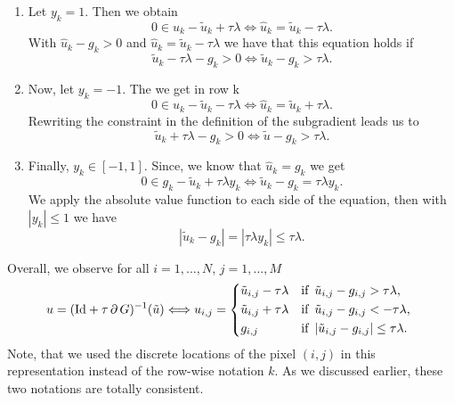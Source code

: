             \begin{enumerate}
                \item Let $y_{k} = 1$. Then we obtain
                    $$
                        0 \in \hat{u}_{k} - \tilde{u}_{k} + \tau\lambda \Longleftrightarrow \hat{u}_{k} = \tilde{u}_{k} - \tau\lambda.
                    $$
                With $\hat{u}_{k} - g_{k} > 0$ and $\hat{u}_{k} = \tilde{u}_{k} - \tau\lambda$ we have that this equation holds if 
                    $$
                        \tilde{u}_{k} - \tau\lambda - g_{k} > 0 \Longleftrightarrow \tilde{u}_{k} - g_{k} > \tau\lambda.
                    $$
                \item Now, let $y_{k} = -1$. The we get in row k
                    $$
                        0 \in \hat{u}_{k} - \tilde{u}_{k} - \tau\lambda \Longleftrightarrow \hat{u}_{k} = \tilde{u}_{k} + \tau\lambda.
                    $$
                Rewriting the constraint in the definition of the subgradient leads us to
                    $$
                        \tilde{u}_{k} + \tau\lambda - g_{k} > 0 \Longleftrightarrow \tilde{u} - g_{k} > \tau\lambda.
                    $$
                \item Finally, $y_{k} \in [-1, 1]$. Since, we know that $\hat{u}_{k} = g_{k}$ we get
                    $$
                        0 \in g_{k} - \tilde{u}_{k} + \tau\lambda y_{k} \Longleftrightarrow \tilde{u}_{k} - g_{k} = \tau\lambda y_{k}.
                    $$
                We apply the absolute value function to each side of the equation, then with $|y_{k}| \le 1$ we have
                    $$
                        |\tilde{u}_{k} - g_{k}| = |\tau\lambda y_{k}| \le \tau\lambda.
                    $$
            \end{enumerate}
        Overall, we observe for all $i = 1, ..., N$, $j = 1, ..., M$
            \begin{equation}
                u = (\textnormal{Id} + \tau\,\partial\,G)^{-1}(\tilde{u}) \Longleftrightarrow u_{i, j} = 
                    \begin{dcases*}
                        \tilde{u}_{i,j} - \tau\lambda & \textnormal{if\, $\tilde{u}_{i,j} - g_{i,j} > \tau\lambda$,} \\
                        \tilde{u}_{i,j} + \tau\lambda & \textnormal{if\, $\tilde{u}_{i,j} - g_{i,j} < - \tau\lambda$,} \\
                        g_{i, j} & \textnormal{if\, $|\tilde{u}_{i,j} - g_{i,j}| \le \tau\lambda$}.
                    \end{dcases*}
            \label{eq:prox_g_tvl1}
            \end{equation}
        Note, that we used the discrete locations of the pixel $(i, j)$ in this representation instead of the row-wise notation $k$. As we discussed earlier, these two notations are totally consistent.


